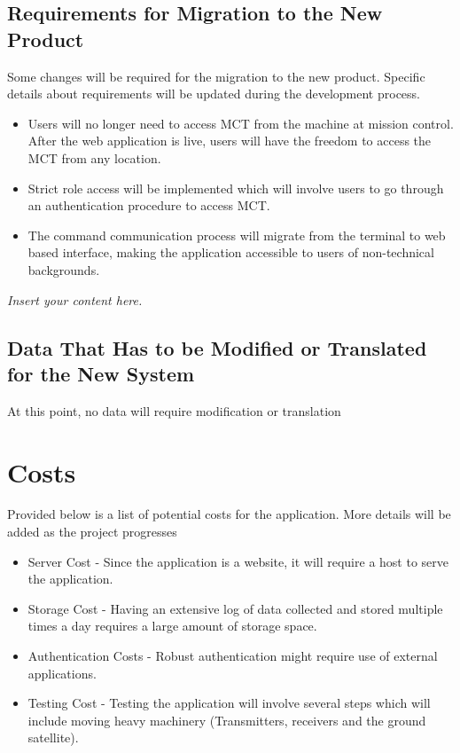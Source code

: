 \documentclass[12pt]{article}
\newcommand{\lips}{\textit{Insert your content here.}}
\begin{document}
\subsection{Requirements for Migration to the New Product}
Some changes will be required for the migration to the new product. Specific details about requirements will be updated during the development process.
\begin{itemize}
    \item Users will no longer need to access MCT from the machine at mission control. After the web application is live, users will have the freedom to access the MCT from any location.
    \item Strict role access will be implemented which will involve users to go through an authentication procedure to access MCT.
    \item The command communication process will migrate from the terminal to web based interface, making the application accessible to users of non-technical backgrounds.
 
\end{itemize}
\lips
\subsection{Data That Has to be Modified or Translated for the New System}
At this point, no data will require modification or translation

\section{Costs}
Provided below is a list of potential costs for the application. More details will be added as the project progresses
\begin{itemize}
    \item Server Cost - Since the application is a website, it will require a host to serve the application.
    \item Storage Cost - Having an extensive log of data collected and stored multiple times a day requires a large amount of storage space.

    \item Authentication Costs - Robust authentication might require use of external applications.
    \item Testing Cost - Testing the application will involve several steps which will include moving heavy machinery (Transmitters, receivers and the ground satellite).

\end{itemize}
\end{document}
